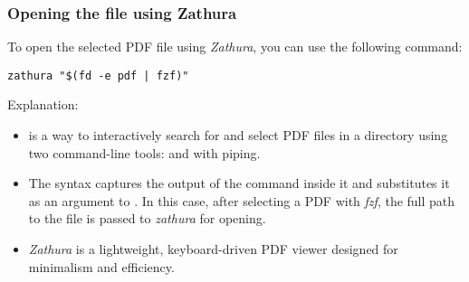 \documentclass[titlepage]{article}
\begin{document}
\subsubsection{Opening the file using Zathura}
To open the selected PDF file using \textit{Zathura}, you can use the following command:
\begin{adjustwidth}{1cm}{1cm}
\begin{tcolorbox}[codebox]
\begin{lstlisting}[numbers=none]
zathura "$(fd -e pdf | fzf)"
\end{lstlisting}
\end{tcolorbox}
\end{adjustwidth}
Explanation:
\begin{itemize}
\item {} is a way to interactively search for and select PDF files in a directory using two command-line tools:  and  with piping.
\item {} The  syntax captures the output of the command inside it and substitutes it as an argument to .
In this case, after selecting a PDF with \textit{fzf}, the full path to the file is passed to \textit{zathura} for opening.
\item \textit{Zathura} is a lightweight, keyboard-driven PDF viewer designed for minimalism and efficiency.
\end{itemize}
\end{document}
